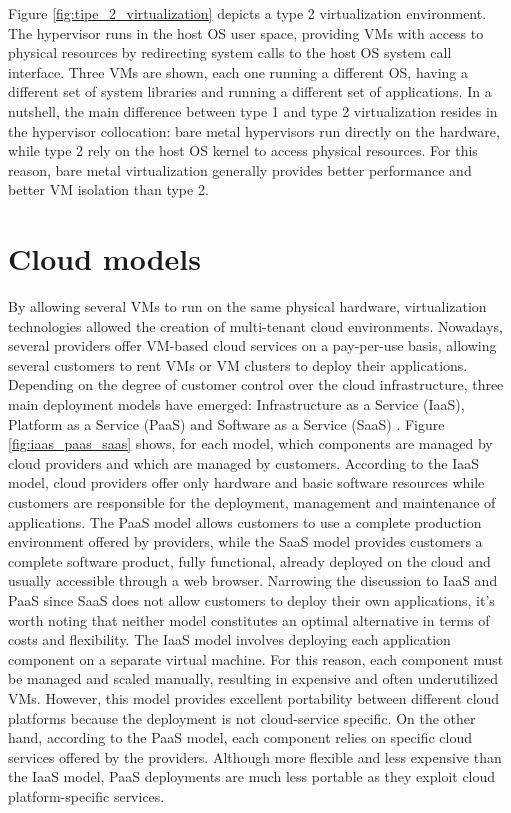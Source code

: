 Figure \ref{fig:tipe_2_virtualization} depicts a type 2 virtualization environment.
The hypervisor runs in the host OS user space, providing VMs with access to physical resources by redirecting system calls to the host OS system call interface. Three VMs are shown, each one running a different OS, having a different set of system libraries and running a different set of applications.
In a nutshell, the main difference between type 1 and type 2 virtualization resides in the hypervisor collocation: bare metal hypervisors run directly on the hardware, while type 2 rely on the host OS kernel to access physical resources. For this reason, bare metal virtualization generally provides better performance and better VM isolation than type 2.

\section{Cloud models}
By allowing several VMs to run on the same physical hardware, virtualization technologies allowed the creation of multi-tenant cloud environments. Nowadays, several providers offer VM-based cloud services on a pay-per-use basis, allowing several customers to rent VMs or VM clusters to deploy their applications.
Depending on the degree of customer control over the cloud infrastructure, three main deployment models have emerged: Infrastructure as a Service (IaaS), Platform as a Service (PaaS) and Software as a Service (SaaS) \cite{stonemanLearnDockerMonth}.
Figure \ref{fig:iaas_paas_saas} shows, for each model, which components are managed by cloud providers and which are managed by customers.
According to the IaaS model, cloud providers offer only hardware and basic software resources while customers are responsible for the deployment, management and maintenance of applications.
The PaaS model allows customers to use a complete production environment offered by providers, while the SaaS model provides customers a complete software product, fully functional, already deployed on the cloud and usually accessible through a web browser.
Narrowing the discussion to IaaS and PaaS since SaaS does not allow customers to deploy their own applications, it's worth noting that neither model constitutes an optimal alternative in terms of costs and flexibility.
The IaaS model involves deploying each application component on a separate virtual machine. For this reason, each component must be managed and scaled manually, resulting in expensive and often underutilized VMs. However, this model provides excellent portability between different cloud platforms because the deployment is not cloud-service specific. On the other hand, according to the PaaS model, each component relies on specific cloud services offered by the providers. 
Although more flexible and less expensive than the IaaS model, PaaS deployments are much less portable as they exploit cloud platform-specific services.

